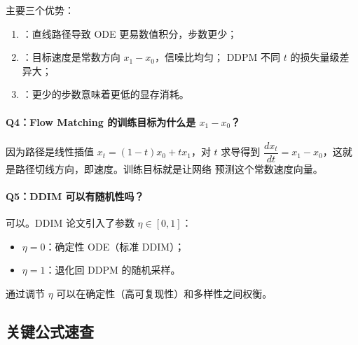 \begin{conceptbox}
主要三个优势：
\begin{enumerate}
  \item {}：直线路径导致 ODE 更易数值积分，步数更少；
  \item {}：目标速度是常数方向 $x_1 - x_0$，信噪比均匀；
        DDPM 不同 $t$ 的损失量级差异大；
  \item {}：更少的步数意味着更低的显存消耗。
\end{enumerate}
\end{conceptbox}

\paragraph{Q4：Flow Matching 的训练目标为什么是 $x_1 - x_0$？}

\begin{conceptbox}
因为路径是线性插值 $x_t = (1-t)x_0 + tx_1$，对 $t$ 求导得到
$\dfrac{dx_t}{dt} = x_1 - x_0$，这就是路径切线方向，即速度。训练目标就是让网络
预测这个常数速度向量。
\end{conceptbox}

\paragraph{Q5：DDIM 可以有随机性吗？}

\begin{conceptbox}
可以。DDIM 论文引入了参数 $\eta \in [0, 1]$：
\begin{itemize}
  \item $\eta = 0$：确定性 ODE（标准 DDIM）；
  \item $\eta = 1$：退化回 DDPM 的随机采样。
\end{itemize}
通过调节 $\eta$ 可以在确定性（高可复现性）和多样性之间权衡。
\end{conceptbox}

\subsection{关键公式速查}

